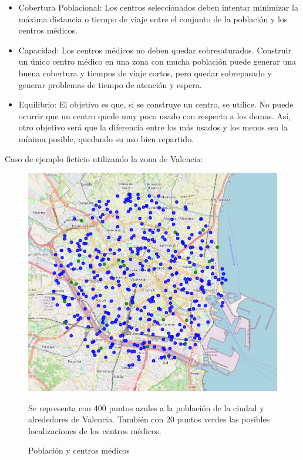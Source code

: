 \documentclass[12pt,a4paper]{book}
\begin{document}
\begin{itemize}
    \item Cobertura Poblacional: Los centros seleccionados deben intentar minimizar la máxima distancia o tiempo de viaje entre el conjunto de la población y los centros médicos.
    \item Capacidad: Los centros médicos no deben quedar sobresaturados. Construir un único centro médico en una zona con mucha población puede generar una buena cobertura y tiempos de viaje cortos, pero quedar sobrepasado y generar problemas de tiempo de atención y espera.
    \item Equilibrio: El objetivo es que, si se construye un centro, se utilice. No puede ocurrir que un centro quede muy poco usado con respecto a los demas. Así, otro objetivo será que la diferencia entre los más usados y los menos sea la mínima posible, quedando su uso bien repartido.
\end{itemize}
Caso de ejemplo ficticio utilizando la zona de Valencia:
\begin{figure}[H]
    \centering
    \begin{minipage}[c]{0.45\textwidth}
        \includegraphics[width=\textwidth]{images/ejemplo_centros_medicos.png}
        \label{fig:poblacion_centros_medicos}
    \end{minipage}
    \hfill
    \begin{minipage}[c]{0.45\textwidth}

        Se representa con 400 puntos azules a la población de la ciudad y alrededores de Valencia. También con 20 puntos verdes las posibles localizaciones de los centros médicos.
    \end{minipage}
    \caption{Población y centros médicos}
\end{figure}
\end{document}
